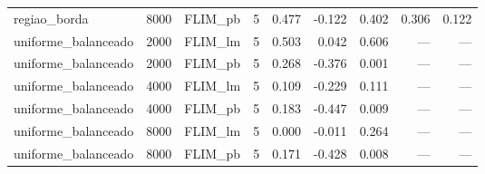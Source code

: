 \begin{adjustbox}{max width=\linewidth}
\begin{tabular}{lllrrrrrr}
regiao\_borda & 8000 & FLIM\_pb & 5 & 0.477 & -0.122 & 0.402 & 0.306 & 0.122 \\
uniforme\_balanceado & 2000 & FLIM\_lm & 5 & 0.503 & 0.042 & 0.606 & --- & --- \\
uniforme\_balanceado & 2000 & FLIM\_pb & 5 & 0.268 & -0.376 & 0.001 & --- & --- \\
uniforme\_balanceado & 4000 & FLIM\_lm & 5 & 0.109 & -0.229 & 0.111 & --- & --- \\
uniforme\_balanceado & 4000 & FLIM\_pb & 5 & 0.183 & -0.447 & 0.009 & --- & --- \\
uniforme\_balanceado & 8000 & FLIM\_lm & 5 & 0.000 & -0.011 & 0.264 & --- & --- \\
uniforme\_balanceado & 8000 & FLIM\_pb & 5 & 0.171 & -0.428 & 0.008 & --- & --- \\
\bottomrule
\end{tabular}
\end{adjustbox}
